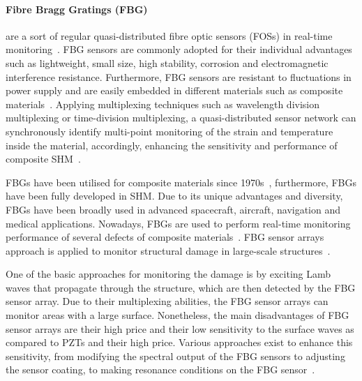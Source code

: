 \paragraph{Fibre Bragg Gratings (FBG)} are a sort of regular quasi-distributed fibre optic sensors (FOSs) in real-time monitoring~\cite{Cai2012}.  
FBG sensors are commonly adopted for their individual advantages such as lightweight, small size, high stability, corrosion and electromagnetic interference resistance. 
Furthermore, FBG sensors are resistant to fluctuations in power supply and are easily embedded in different materials such as composite materials~\cite{Jang2012}. 
Applying multiplexing techniques such as wavelength division multiplexing or time-division multiplexing, a quasi-distributed sensor network can synchronously identify multi-point monitoring of the strain and temperature inside the material, accordingly, enhancing the sensitivity and performance of composite SHM~\cite{Jang2012}.

FBGs have been utilised for composite materials since 1970s~\cite{othonos1999fiber}, furthermore, FBGs have been fully developed in SHM. 
Due to its unique advantages and diversity, FBGs have been broadly used in advanced spacecraft, aircraft, navigation and medical applications. 
Nowadays, FBGs are used to perform real-time monitoring performance of several defects of composite materials~\cite{rezayat2016reconstruction}.
FBG sensor arrays approach is applied to monitor structural damage in large-scale structures~\cite{Wee2017}.

One of the basic approaches for monitoring the damage is by exciting Lamb waves that propagate through the structure, which are then detected by the FBG sensor array. 
Due to their multiplexing abilities, the FBG sensor arrays can monitor areas with a large surface. 
Nonetheless, the main disadvantages of FBG sensor arrays are their high price and their low sensitivity to the surface waves as compared to PZTs and their high price. 
Various approaches exist to enhance this sensitivity, from modifying the spectral output of the FBG sensors to adjusting the sensor coating, to making resonance conditions on the FBG sensor~\cite{Wee2017}.

